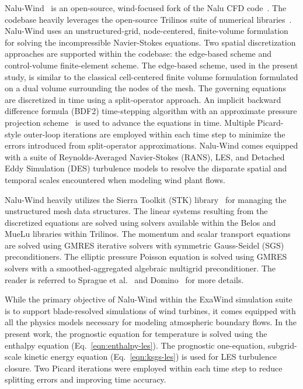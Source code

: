 Nalu-Wind~\cite{SpragueAVR2020} is an open-source, wind-focused fork of the Nalu CFD
code~\cite{Domino:2015}. The codebase heavily leverages the open-source Trilinos
suite of numerical libraries~\cite{Heroux:2003}. Nalu-Wind uses an
unstructured-grid, node-centered, finite-volume formulation for solving the incompressible
Navier-Stokes equations. Two spatial discretization approaches are supported
within the codebase: the edge-based scheme and control-volume finite-element
scheme. The edge-based scheme, used in the present study, is similar to the
classical cell-centered finite volume formulation formulated on a dual volume
surrounding the nodes of the mesh. The governing equations are discretized in
time using a split-operator approach. An implicit backward difference formula
(BDF2) time-stepping algorithm with an approximate pressure projection
scheme~\cite{Moen-Domino:2003} is used to advance the equations in time.
Multiple Picard-style outer-loop iterations are employed within each time step
to minimize the errors introduced from split-operator approximations. Nalu-Wind
comes equipped with a suite of Reynolds-Averaged Navier-Stokes (RANS), LES, and
Detached Eddy Simulation (DES) turbulence models to resolve the disparate
spatial and temporal scales encountered when modeling wind plant flows.

Nalu-Wind heavily utilizes the Sierra Toolkit (STK) library~\cite{Edwards:2010}
for managing the unstructured mesh data structures. The linear systems resulting
from the discretized equations are solved using solvers available within the
Belos and MueLu libraries within Trilinos. The momentum and scalar transport
equations are solved using GMRES iterative solvers with symmetric Gauss-Seidel
(SGS) preconditioners. The elliptic pressure Poisson equation is solved using
GMRES solvers with a smoothed-aggregated algebraic multigrid preconditioner. The
reader is referred to Sprague et al.~\cite{SpragueAVR2020} and
Domino~\cite{Domino:2015} for more details.

While the primary objective of Nalu-Wind within the ExaWind simulation suite is
to support blade-resolved simulations of wind turbines, it comes equipped
with all the physics models necessary for modeling atmospheric boundary flows.
In the present work, the prognostic equation for temperature is solved using the
enthalpy equation (Eq.~\ref{eqn:enthalpy-les}). The prognostic one-equation,
subgrid-scale kinetic energy equation (Eq.~\ref{eqn:ksgs-les}) is used for LES
turbulence closure. Two Picard iterations were employed within each time step to
reduce splitting errors and improving time accuracy.

